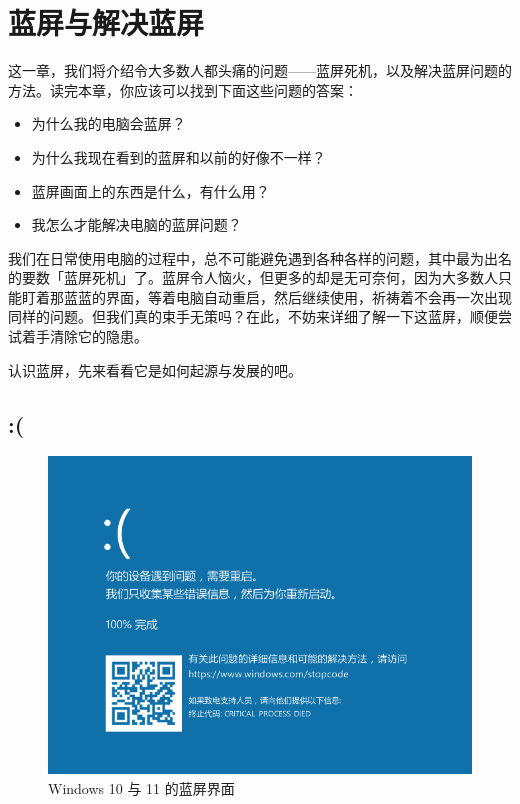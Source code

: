 \chapter{蓝屏与解决蓝屏}
\label{cha:recover-from-bsod}

\begin{intro}
  这一章，我们将介绍令大多数人都头痛的问题——蓝屏死机，以及解决蓝屏问题的方法。读完本章，你应该可以找到下面这些问题的答案：
  
  \begin{itemize}
    \item 为什么我的电脑会蓝屏？
    \item 为什么我现在看到的蓝屏和以前的好像不一样？
    \item 蓝屏画面上的东西是什么，有什么用？
    \item 我怎么才能解决电脑的蓝屏问题？
  \end{itemize}
\end{intro}

我们在日常使用电脑的过程中，总不可能避免遇到各种各样的问题，其中最为出名的要数「蓝屏死机」了。蓝屏令人恼火，但更多的却是无可奈何，因为大多数人只能盯着那蓝蓝的界面，等着电脑自动重启，然后继续使用，祈祷着不会再一次出现同样的问题。但我们真的束手无策吗？在此，不妨来详细了解一下这蓝屏，顺便尝试着手清除它的隐患。

认识蓝屏，先来看看它是如何起源与发展的吧。

\section{:(}

\begin{figure}[htb!]
  \centering
  \includegraphics[width=.65\textwidth]{assets/advanced/Win-10-BSoD.png}
  \caption{Windows 10 与 11 的蓝屏界面}
  \label{fig:Win-11-BSoD}
\end{figure}


